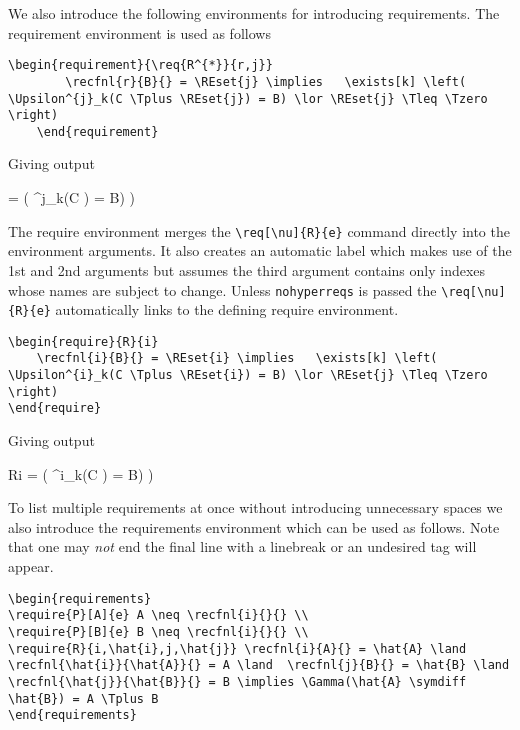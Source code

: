 \documentclass[leqno,11pt]{amsart}
\begin{document}
We also introduce the following environments for introducing requirements.  The requirement environment is used as follows

\begin{lstlisting}[breaklines]
	\begin{requirement}{\req{R^{*}}{r,j}}
		\recfnl{r}{B}{} = \REset{j} \implies   \exists[k] \left( \Upsilon^{j}_k(C \Tplus \REset{j}) = B) \lor \REset{j} \Tleq \Tzero \right) 
	\end{requirement}
\end{lstlisting}

Giving output 

	\begin{requirement}{}
		 =  \implies   \exists[k] \left( \Upsilon^{j}_k(C \Tplus {}) = B) \lor {} \Tleq \Tzero \right) 
	\end{requirement}

The require environment merges the \verb=\req[\nu]{R}{e}= command directly into the environment arguments.  It also creates an automatic label which makes use of the 1st and 2nd arguments but assumes the third argument contains only indexes whose names are subject to change.  Unless \verb=nohyperreqs= is passed the \verb=\req[\nu]{R}{e}= automatically links to the defining require environment.

\begin{lstlisting}[breaklines]
\begin{require}{R}{i}
	\recfnl{i}{B}{} = \REset{i} \implies   \exists[k] \left( \Upsilon^{i}_k(C \Tplus \REset{i}) = B) \lor \REset{j} \Tleq \Tzero \right)
\end{require}
\end{lstlisting}

 Giving output 

\begin{require}{R}{i}
	 =  \implies   \exists[k] \left( \Upsilon^{i}_k(C \Tplus {}) = B) \lor {} \Tleq \Tzero \right)
\end{require}

To list multiple requirements at once without introducing unnecessary spaces we also introduce the requirements environment which can be used as follows.  Note that one may \textit{not} end the final line with a linebreak or an undesired tag will appear.

\begin{lstlisting}[breaklines]
\begin{requirements}
\require{P}[A]{e} A \neq \recfnl{i}{}{} \\
\require{P}[B]{e} B \neq \recfnl{i}{}{} \\
\require{R}{i,\hat{i},j,\hat{j}} \recfnl{i}{A}{} = \hat{A} \land \recfnl{\hat{i}}{\hat{A}}{} = A \land  \recfnl{j}{B}{} = \hat{B} \land \recfnl{\hat{j}}{\hat{B}}{} = B \implies \Gamma(\hat{A} \symdiff \hat{B}) = A \Tplus B 
\end{requirements}
\end{lstlisting}
\end{document}
